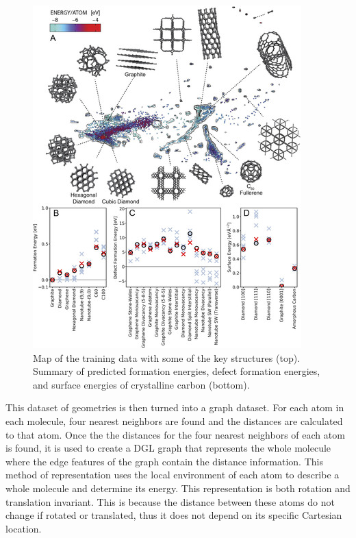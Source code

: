 \documentclass[12pt, abstract = true]{scrartcl}
\begin{document}
\begin{figure}
  \centering
  \includegraphics[scale=2]{carbon}
  
  \caption{Map of the training data with some of the key structures (top). Summary of predicted formation energies, defect formation energies, and surface energies of crystalline carbon (bottom).}\label{fig:train}
\end{figure}


This dataset of geometries is then turned into a graph dataset. For each atom in each molecule, four nearest neighbors are found and the distances are calculated to that atom. Once the the distances for the four nearest neighbors of each atom is found, it is used to create a DGL\cite{dgl} graph that represents the whole molecule where the edge features of the graph contain the distance information. This method of representation uses the local environment of each atom to describe a whole molecule and determine its energy. This representation is both rotation and translation invariant. This is because the distance between these atoms do not change if rotated or translated, thus it does not depend on its specific Cartesian location.
\end{document}
